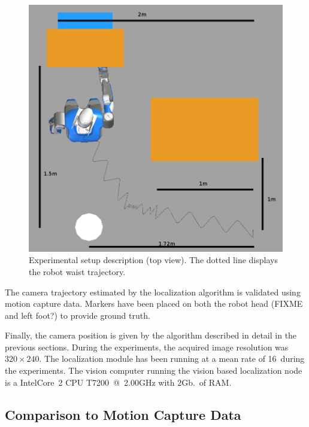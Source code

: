 \begin{figure}[ht!]
  \begin{center}
    \includegraphics[width=\linewidth]{images/dimensions.png}
  \end{center}
  \caption{Experimental setup description (top view). The dotted line
    displays the robot waist trajectory.\label{fig:xp_setup_dim}}
\end{figure}


The camera trajectory estimated by the localization algorithm is
validated using motion capture data. Markers have been placed on both
the robot head (FIXME and left foot?) to provide ground truth.


Finally, the camera position is given by the algorithm described in
detail in the previous sections. During the experiments, the acquired
image resolution was $320 \times 240$. The localization module has
been running at a mean rate of 16\hertz~during the experiments. The
vision computer running the vision based localization node is a
Intel\textregistered Core\texttrademark\ 2 CPU T7200~@~2.00GHz with
2Gb.\ of RAM.


\subsection{Comparison to Motion Capture Data}\label{sec:mocap}

